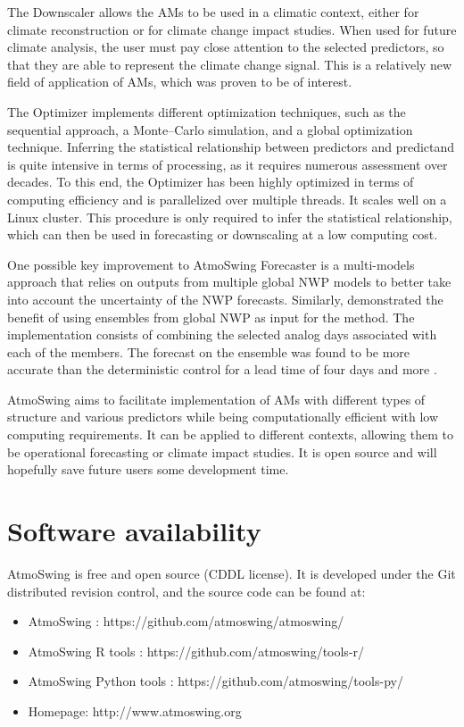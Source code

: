 \documentclass[review]{elsarticle}
\begin{document}
The Downscaler allows the AMs to be used in a climatic context, either for climate reconstruction or for climate change impact studies. When used for future climate analysis, the user must pay close attention to the selected predictors, so that they are able to represent the climate change signal. This is a relatively new field of application of AMs, which was proven to be of interest.

The Optimizer implements different optimization techniques, such as the sequential approach, a Monte--Carlo simulation, and a global optimization technique. Inferring the statistical relationship between predictors and predictand is quite intensive in terms of processing, as it requires numerous assessment over decades. To this end, the Optimizer has been highly optimized in terms of computing efficiency and is parallelized over multiple threads. It scales well on a Linux cluster. This procedure is only required to infer the statistical relationship, which can then be used in forecasting or downscaling at a low computing cost. 

One possible key improvement to AtmoSwing Forecaster is a multi-models approach that relies on outputs from multiple global NWP models to better take into account the uncertainty of the NWP forecasts. Similarly, \citet{Thevenot2004} demonstrated the benefit of using ensembles from global NWP as input for the method. The implementation consists of combining the selected analog days associated with each of the members. The forecast on the ensemble was found to be more accurate than the deterministic control for a lead time of four days and more \citep{Thevenot2004}. 

AtmoSwing aims to facilitate implementation of AMs with different types of structure and various predictors while being computationally efficient with low computing requirements. It can be applied to different contexts, allowing them to be operational forecasting or climate impact studies. It is open source and will hopefully save future users some development time.


\section*{Software availability}

AtmoSwing is free and open source (CDDL license). It is developed under the Git distributed revision control, and the source code can be found at:

\begin{itemize}
	\item AtmoSwing \citep{Horton2018c}: https://github.com/atmoswing/atmoswing/
	\item AtmoSwing R tools \citep{Horton2018d}: https://github.com/atmoswing/tools-r/
	\item AtmoSwing Python tools \citep{Horton2018e}: https://github.com/atmoswing/tools-py/
	\item Homepage: http://www.atmoswing.org
\end{itemize}
\end{document}
